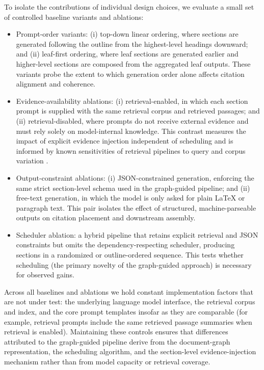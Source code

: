 \documentclass{article}%
\begin{document}
To isolate the contributions of individual design choices, we evaluate a small set of controlled baseline variants and ablations:

\begin{itemize}
  \item Prompt-order variants: (i) top-down linear ordering, where sections are generated following the outline from the highest-level headings downward; and (ii) leaf-first ordering, where leaf sections are generated earlier and higher-level sections are composed from the aggregated leaf outputs. These variants probe the extent to which generation order alone affects citation alignment and coherence.
  \item Evidence-availability ablations: (i) retrieval-enabled, in which each section prompt is supplied with the same retrieval corpus and retrieved passages; and (ii) retrieval-disabled, where prompts do not receive external evidence and must rely solely on model-internal knowledge. This contrast measures the impact of explicit evidence injection independent of scheduling and is informed by known sensitivities of retrieval pipelines to query and corpus variation \cite{web_penha_2021_evaluating_the_robustness_of_retrieval_pipelines}.
  \item Output-constraint ablations: (i) JSON-constrained generation, enforcing the same strict section-level schema used in the graph-guided pipeline; and (ii) free-text generation, in which the model is only asked for plain LaTeX or paragraph text. This pair isolates the effect of structured, machine-parseable outputs on citation placement and downstream assembly.
  \item Scheduler ablation: a hybrid pipeline that retains explicit retrieval and JSON constraints but omits the dependency-respecting scheduler, producing sections in a randomized or outline-ordered sequence. This tests whether scheduling (the primary novelty of the graph-guided approach) is necessary for observed gains.
\end{itemize}

Across all baselines and ablations we hold constant implementation factors that are not under test: the underlying language model interface, the retrieval corpus and index, and the core prompt templates insofar as they are comparable (for example, retrieval prompts include the same retrieved passage summaries when retrieval is enabled). Maintaining these controls ensures that differences attributed to the graph-guided pipeline derive from the document-graph representation, the scheduling algorithm, and the section-level evidence-injection mechanism rather than from model capacity or retrieval coverage.
\end{document}
